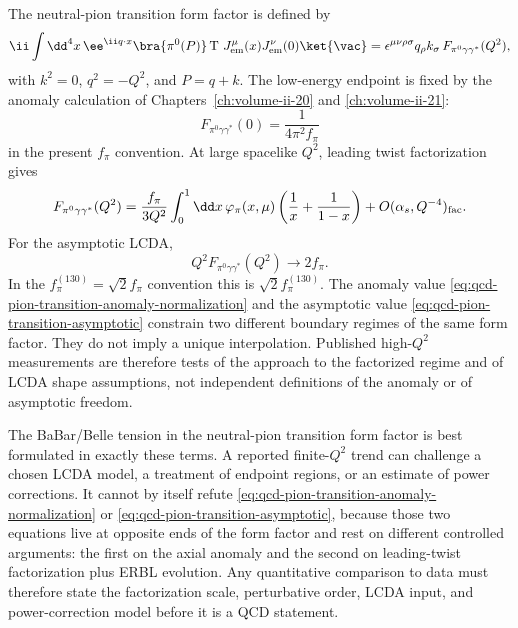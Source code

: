 The neutral-pion transition form factor is defined by
\begin{equation}
  \ii\int\dd^4x\,\ee^{\ii q\cdot x}
  \bra{\pi^0(P)}
  \operatorname T\,J^\mu_{\rm em}(x)J^\nu_{\rm em}(0)
  \ket{\vac}
  =
  \epsilon^{\mu\nu\rho\sigma}q_\rho k_\sigma\,
  F_{\pi^0\gamma\gamma^*}(Q^2),
  \label{eq:qcd-pion-transition-form-factor-definition}
\end{equation}
with \(k^2=0\), \(q^2=-Q^2\), and \(P=q+k\).  The low-energy endpoint is fixed
by the anomaly calculation of Chapters~\ref{ch:volume-ii-20} and
\ref{ch:volume-ii-21}:
\begin{equation}
  F_{\pi^0\gamma\gamma^*}(0)=\frac1{4\pi^2f_\pi}
  \label{eq:qcd-pion-transition-anomaly-normalization}
\end{equation}
in the present \(f_\pi\) convention.  At large spacelike \(Q^2\), leading
twist factorization gives
\begin{equation}
  F_{\pi^0\gamma\gamma^*}(Q^2)
  =
  \frac{f_\pi}{3Q^2}
  \int_0^1\dd x\,\varphi_\pi(x,\mu)
  \left(\frac1x+\frac1{1-x}\right)
  +O(\alpha_s,Q^{-4})_{\rm fac}.
  \label{eq:qcd-pion-transition-factorization}
\end{equation}
For the asymptotic LCDA,
\begin{equation}
  Q^2F_{\pi^0\gamma\gamma^*}(Q^2)\longrightarrow 2f_\pi .
  \label{eq:qcd-pion-transition-asymptotic}
\end{equation}
In the \(f_\pi^{(130)}=\sqrt2 f_\pi\) convention this is
\(\sqrt2 f_\pi^{(130)}\).  The anomaly value
\eqref{eq:qcd-pion-transition-anomaly-normalization} and the asymptotic value
\eqref{eq:qcd-pion-transition-asymptotic} constrain two different boundary
regimes of the same form factor.  They do not imply a unique interpolation.
Published high-\(Q^2\) measurements are therefore tests of the approach to the
factorized regime and of LCDA shape assumptions, not independent definitions
of the anomaly or of asymptotic freedom.

The BaBar/Belle tension in the neutral-pion transition form factor is best
formulated in exactly these terms.  A reported finite-\(Q^2\) trend can
challenge a chosen LCDA model, a treatment of endpoint regions, or an estimate
of power corrections.  It cannot by itself refute
\eqref{eq:qcd-pion-transition-anomaly-normalization} or
\eqref{eq:qcd-pion-transition-asymptotic}, because those two equations live at
opposite ends of the form factor and rest on different controlled arguments:
the first on the axial anomaly and the second on leading-twist factorization
plus ERBL evolution.  Any quantitative comparison to data must therefore state
the factorization scale, perturbative order, LCDA input, and power-correction
model before it is a QCD statement.

